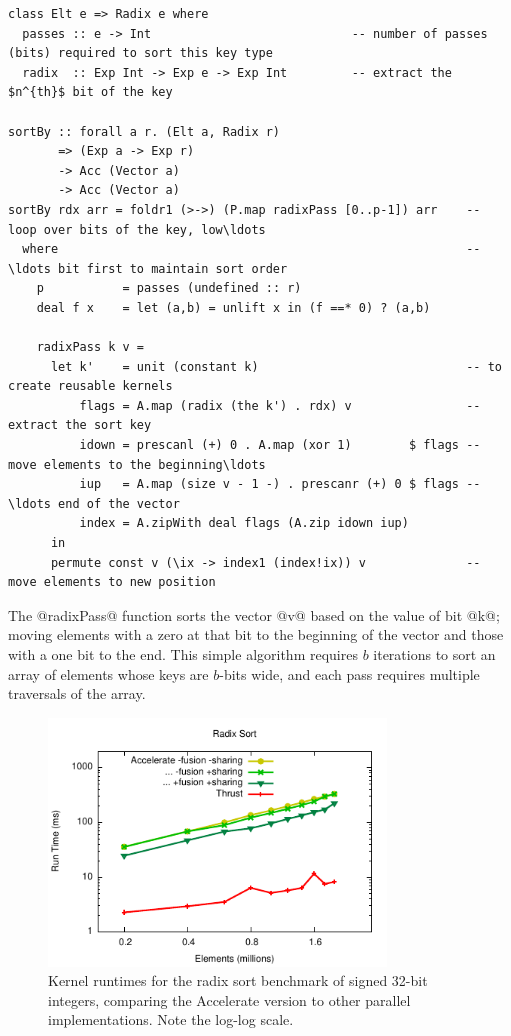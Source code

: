 \begin{lstlisting}[style=haskell
    ,float
    ,label=lst:radixsort
    ,caption={Radix sort algorithm in Accelerate}]
class Elt e => Radix e where
  passes :: e -> Int                            -- number of passes (bits) required to sort this key type
  radix  :: Exp Int -> Exp e -> Exp Int         -- extract the $n^{th}$ bit of the key

sortBy :: forall a r. (Elt a, Radix r)
       => (Exp a -> Exp r)
       -> Acc (Vector a)
       -> Acc (Vector a)
sortBy rdx arr = foldr1 (>->) (P.map radixPass [0..p-1]) arr    -- loop over bits of the key, low\ldots
  where                                                         -- \ldots bit first to maintain sort order
    p           = passes (undefined :: r)
    deal f x    = let (a,b) = unlift x in (f ==* 0) ? (a,b)

    radixPass k v =
      let k'    = unit (constant k)                             -- to create reusable kernels
          flags = A.map (radix (the k') . rdx) v                -- extract the sort key
          idown = prescanl (+) 0 . A.map (xor 1)        $ flags -- move elements to the beginning\ldots
          iup   = A.map (size v - 1 -) . prescanr (+) 0 $ flags -- \ldots end of the vector
          index = A.zipWith deal flags (A.zip idown iup)
      in
      permute const v (\ix -> index1 (index!ix)) v              -- move elements to new position
\end{lstlisting}

The @radixPass@ function sorts the vector @v@ based on the value of
bit @k@; moving elements with a zero at that bit to the beginning of the
vector and those with a one bit to the end. This simple algorithm requires
$b$ iterations to sort an array of elements whose keys are $b$-bits wide, and
each pass requires multiple traversals of the array.

\begin{figure}
    \begin{center}
        \includegraphics[width=0.8\textwidth]{images/sec-6/radixsort/radixsort}
    \end{center}
    \caption[Radix sort kernel benchmarks]{Kernel runtimes for the radix sort benchmark
        of signed 32-bit integers, comparing the Accelerate version to other
        parallel implementations. Note the log-log scale.}
    \label{fig:radixsort}
\end{figure}

